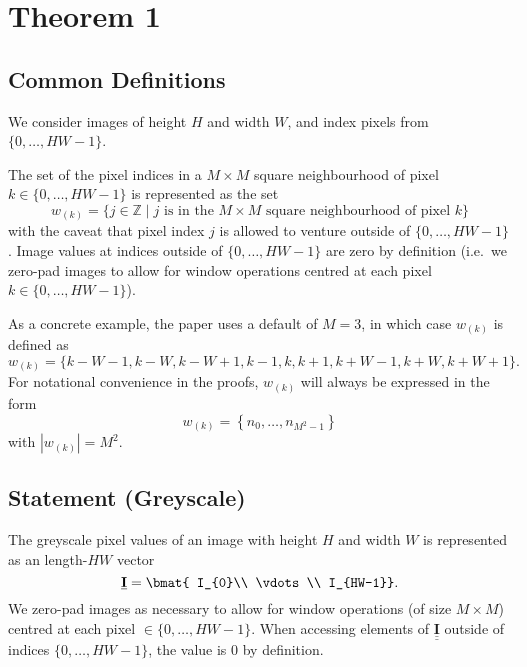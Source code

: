 \documentclass{article}
\def\vt#1{\underline{\mathbf{#1}}}
\def\mt#1{\underline{\underline{\mathbf{#1}}}}
\begin{document}
\section{Theorem 1}
\subsection{Common Definitions}
We consider images of height $H$ and width $W$, and index pixels from $\{0,\dots,HW-1\}$.

The set of the pixel indices in a $M\times M$ square neighbourhood of pixel $k\in\{0,\dots,HW-1\}$ is represented as the set
$$w_{(k)} = \{j \in \mathbb{Z} \mid j\text{ is in the $M\times M$ square neighbourhood of pixel }k\}$$
with the caveat that pixel index $j$ is allowed to venture outside of $\{0,\dots, HW-1\}$. Image values at indices outside of $\{0,\dots,HW-1\}$ are zero by definition (i.e.\ we zero-pad images to allow for window operations centred at each pixel $k\in\{0,\dots, HW-1\}$).

As a concrete example, the paper uses a default of $M=3$, in which case $w_{(k)}$ is defined as
$$ w_{(k)} = \{k-W-1, k-W, k-W+1, k-1, k, k+1, k+W-1, k+W, k+W+1\}.$$
For notational convenience in the proofs, $w_{(k)}$ will always be expressed in the form
$$w_{(k)} = \left\{n_0, \dots, n_{M^2-1} \right\}$$
with $\left|w_{(k)}\right|=M^2$.

\subsection{Statement (Greyscale)}
The greyscale pixel values of an image with height $H$ and width $W$ is represented as an length-$HW$ vector
$$\vt I = \bmat{
    I_{0}\\
    \vdots\\
    I_{HW-1}}.$$
We zero-pad images as necessary to allow for window operations (of size $M\times M$) centred at each pixel $\in\{0,\dots,HW-1\}$. When accessing elements of $\mt I$ outside of indices $\{0, \dots, HW-1\}$, the value is 0 by definition.
\end{document}
